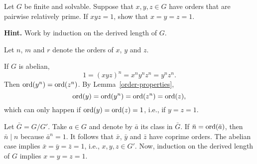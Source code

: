 \begin{probl}
    Let\/ $G$ be finite and solvable. Suppose that\/ $x, y, z \in G$ have orders that are pairwise relatively prime. If\/ $xyz = 1$, show that\/ $x=y=z=1$.

    \textrm{\rm\textbf{Hint.} Work by induction on the derived length of $G$.}
\end{probl}

\begin{solution} Let $n$, $m$ and $r$ denote the orders of $x$, $y$ and $z$. 

If $G$ is abelian,
$$
    1=(xyz)^n = x^ny^nz^n = y^nz^n.
$$
Then ${\rm ord}(y^n)={\rm ord}(z^n)$. By Lemma~\ref{order-properties},
$$
    {\rm ord}(y)={\rm ord}(y^n)={\rm ord}(z^n)={\rm ord}(z),
$$
which can only happen if ${\rm ord}(y)={\rm ord}(z)=1$, i.e., if $y=z=1$.

Let $\bar G=G/G'$. Take $a\in G$ and denote by $\bar a$ its class in $\bar G$. If $\bar n={\rm ord}(\bar a)$, then $\bar n\mid n$ because $\bar a^n=1$. It follows that $\bar x$, $\bar y$ and $\bar z$ have coprime orders. The abelian case implies $\bar x=\bar y=\bar z=1$, i.e., $x,y,z\in G'$. Now, induction on the derived length of $G$ implies $x=y=z=1$.

\end{solution}